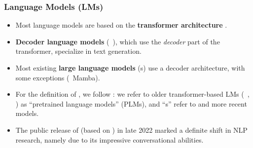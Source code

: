 \begin{frame}
    \frametitle{Language Models (LMs)}
    \begin{itemize}[<+->]
        \item Most language models are based on the \textbf{transformer architecture} \citep{vaswani2017attention}.
        \item \textbf{Decoder language models} ({\eg}\ {\gpt}), which use the \emph{decoder} part of the transformer, specialize in text generation.
        \item Most existing \textbf{large language models} ({\llm}s) use a decoder architecture, with some exceptions ({\eg}\ Mamba).
        \item For the definition of {\llm}, we follow \citet{zhao2023survey}: we refer to older transformer-based LMs (\eg\ {\bert}, {\gptt}) as ``pretrained language models'' (PLMs), and ``{\llm}s'' refer to {\gptthree} and more recent models.
        \item The public release of {\chatgpt} (based on {\gptthree}) in late 2022 marked a definite shift in NLP research, namely due to its impressive conversational abilities.
    \end{itemize}
\end{frame}